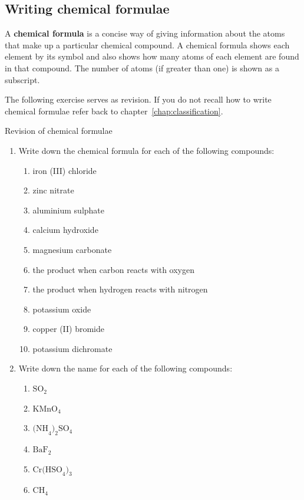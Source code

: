 \subsection*{Writing chemical formulae}
\nopagebreak
\label{m38721*id62835}A \textbf{chemical formula} is a concise way of giving information about the atoms that make up a particular chemical compound. A chemical formula shows each element by its symbol and also shows how many atoms of each element are found in that compound. The number of atoms (if greater than one) is shown as a subscript.\par 
The following exercise serves as revision. If you do not recall how to write chemical formulae refer back to chapter~\ref{chap:classification}.
\begin{exercises}{Revision of chemical formulae}
\begin{enumerate}[noitemsep, label=\textbf{\arabic*}.]
  \item Write down the chemical formula for each of the following compounds:
\begin{enumerate}[noitemsep, label=\textbf{\alph*}. ]
 \item iron (III) chloride
\item zinc nitrate
\item aluminium sulphate
\item calcium hydroxide
\item magnesium carbonate
\item the product when carbon reacts with oxygen
\item the product when hydrogen reacts with nitrogen
\item potassium oxide
\item copper (II) bromide
\item potassium dichromate
\end{enumerate}
\item Write down the name for each of the following compounds:
\begin{enumerate}[noitemsep, label=\textbf{\alph*}. ]
 \item $\text{SO}_2$
\item $\text{KMnO}_4$
\item $\text{(NH}_{4}\text{)}_{2}\text{SO}_{4}$
\item $\text{BaF}_2$
\item $\text{Cr(HSO}_{4}\text{)}_{3}$
\item $\text{CH}_{4}$
\end{enumerate}
\end{enumerate}

\end{exercises}

